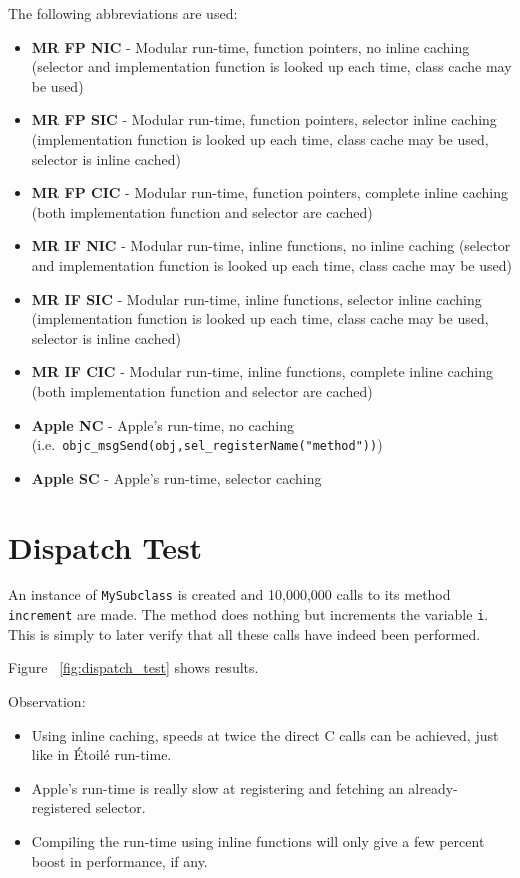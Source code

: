The following abbreviations are used:
\begin{itemize}
  \item{\bf{MR FP NIC}} - Modular run-time, function pointers, no inline caching (selector and implementation function is looked up each time, class cache may be used)
  \item{\bf{MR FP SIC}} - Modular run-time, function pointers, selector inline caching (implementation function is looked up each time, class cache may be used, selector is inline cached)
  \item{\bf{MR FP CIC}} - Modular run-time, function pointers, complete inline caching (both implementation function and selector are cached)
  \item{\bf{MR IF NIC}} - Modular run-time, inline functions, no inline caching (selector and implementation function is looked up each time, class cache may be used)
  \item{\bf{MR IF SIC}} - Modular run-time, inline functions, selector inline caching (implementation function is looked up each time, class cache may be used, selector is inline cached)
  \item{\bf{MR IF CIC}} - Modular run-time, inline functions, complete inline caching (both implementation function and selector are cached)
  \item{\bf{Apple NC}} - Apple's run-time, no caching (i.e.\ \verb=objc_msgSend(obj,=\newline{}\verb=sel_registerName("method"))=)
  \item{\bf{Apple SC}} - Apple's run-time, selector caching 
\end{itemize}

\section{Dispatch Test}

An instance of \verb=MySubclass= is created and 10,000,000 calls to its method \verb=increment= are made. The method does nothing but increments the variable \verb=i=. This is simply to later verify that all these calls have indeed been performed.

Figure ~\ref{fig:dispatch_test} shows results.

Observation:

\begin{itemize}
  \item Using inline caching, speeds at twice the direct C calls can be achieved, just like in \'Etoil\'e run-time.
  \item Apple's run-time is really slow at registering and fetching an already-registered selector.
  \item Compiling the run-time using inline functions will only give a few percent boost in performance, if any.
\end{itemize}

